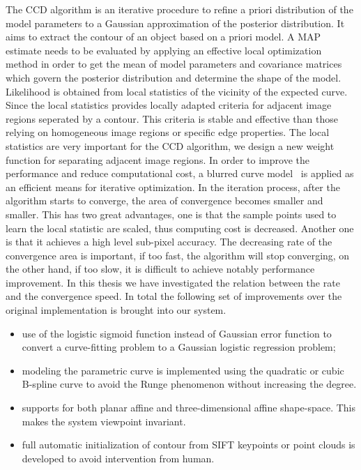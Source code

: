 The CCD algorithm is an iterative procedure to refine a priori distribution of the model parameters to a Gaussian
approximation of the posterior distribution. It aims to extract the
contour of an object based on a priori model. A MAP estimate needs to be
evaluated by applying an effective local optimization method in order to get
the mean of model parameters and covariance matrices which govern the
posterior distribution and determine the shape of the model. Likelihood is 
obtained from local statistics of the vicinity of the expected
curve. Since the local statistics provides locally adapted criteria for
adjacent image regions seperated by a contour. This criteria is stable
and effective than those relying on homogeneous image regions or
specific edge properties. The local statistics are very
important for the CCD algorithm, we design a new weight
function for separating adjacent image regions. 
 In order to improve the performance and
reduce computational cost, a blurred curve model~\cite{hanek2004contracting} is applied as an efficient means for
iterative optimization. In the iteration process, after the
algorithm starts to converge, the area of
convergence becomes smaller and smaller. This has two great
advantages, one is that the sample points used to learn the local statistic
are scaled, thus computing cost is decreased. Another one is that it
achieves a high level sub-pixel accuracy. The decreasing rate of the
convergence area is important, if too fast, the algorithm will stop
converging, on the other hand, if too slow, it is difficult to achieve
notably performance improvement. In this thesis we have investigated the relation between
the rate and the convergence speed. In total the following set of
improvements over the original implementation is brought into our system.
\begin{itemize}
\item use of the logistic sigmoid function instead of Gaussian error
  function to convert a curve-fitting problem to a Gaussian logistic
  regression problem;
\item modeling the parametric curve is implemented using the quadratic or
cubic B-spline curve  to avoid the Runge phenomenon without increasing
the degree.
\item supports for both planar affine and three-dimensional affine
  shape-space. This makes the system viewpoint invariant.
\item full automatic initialization of contour from SIFT keypoints or
  point clouds is developed to avoid
  intervention from human.
\end{itemize}

